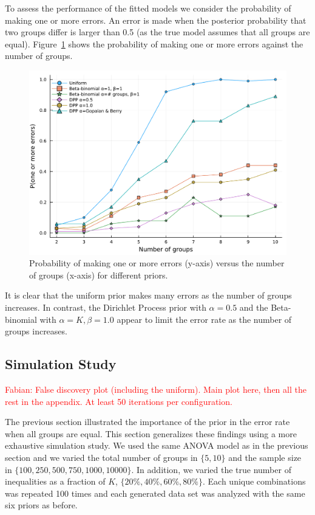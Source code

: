 \documentclass[11pt,a4paper]{article}
\theoremstyle{definition} %
\theoremstyle{case}
\newcommand{\FD}[1]{\textcolor{red}{Fabian: #1 }}
\begin{document}
To assess the performance of the fitted models we consider the probability of making one or more errors. An error is made when the posterior probability that two groups differ is larger than 0.5 (as the true model assumes that all groups are equal). Figure~\ref{fig:small_simulation} shows the probability of making one or more errors against the number of groups.
\begin{figure}
    \centering
    \includegraphics[width=\textwidth]{figures/one_or_more_errors2.pdf}
    \caption{Probability of making one or more errors (y-axis) versus the number of groups (x-axis) for different priors.}
    \label{fig:small_simulation}
\end{figure}
It is clear that the uniform prior makes many errors as the number of groups increases. In contrast, the Dirichlet Process prior with $\alpha = 0.5$ and the Beta-binomial with $\alpha = K, \beta=1.0$ appear to limit the error rate as the number of groups increases.

\subsection{Simulation Study} \label{sec:simulation}
\FD{False discovery plot (including the uniform). Main plot here, then all the rest in the appendix. At least 50 iterations per configuration.}

The previous section illustrated the importance of the prior in the error rate when all groups are equal. This section generalizes these findings using a more exhaustive simulation study. We used the same ANOVA model as in the previous section and we varied the total number of groups in $\{5,10\}$ and the sample size in $\{100, 250, 500, 750, 1000, 10000\}$. In addition, we varied the true number of inequalities as a fraction of $K$, $\{20\%, 40\%, 60\%, 80\%\}$. Each unique combinations was repeated 100 times and each generated data set was analyzed with the same six priors as before. 
\end{document}
